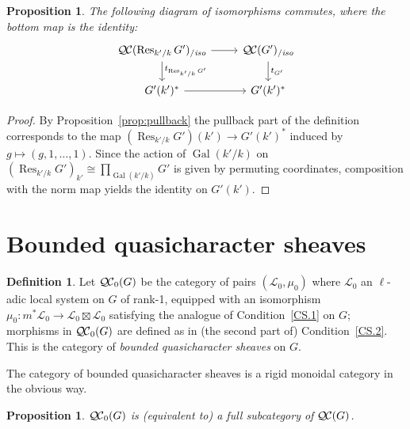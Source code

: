 \documentclass[11pt]{amsart}
\theoremstyle{plain}
\newtheorem{proposition}[theorem]{Proposition}
\theoremstyle{definition}
\newtheorem{definition}[theorem]{Definition}
\theoremstyle{remark}
\newcommand{\EE}{\mathbb{\bar Q}_\ell}
\DeclareMathOperator{\Gal}{Gal}
\DeclareMathOperator{\Res}{Res}
\newcommand{\sheafHom}{{\mathscr{H}\hskip-4pt{\it o}\hskip-2pt{\it m}}}
\newcommand{\ceq}{{\, :=\, }}
\newcommand{\qcs}[1]{{\mathcal{#1}}}
\newcommand{\QC}{{\mathcal{Q\hskip-0.8pt C}}}
\newcommand{\QCb}{{\QC_0}}
\newcommand{\QCiso}[1]{\QC(#1)_{/\textit{iso}}}
\newcommand{\trFrob}[1]{t_{#1}}
\begin{document}
\begin{proposition}
The following diagram of isomorphisms commutes, where the bottom map is the identity:
\[
\begin{tikzcd}
\QCiso{\Res_{k'/k} G'} \dar{\trFrob{\Res_{k'/k} G'}} \rar & \QCiso{G'} \dar{\trFrob{G'}}\\
G'(k')^* \rar & G'(k')^*
\end{tikzcd}
\]
\end{proposition}
\begin{proof}
By Proposition~\ref{prop:pullback} the pullback part of the definition corresponds to the map $(\Res_{k'/k}G')(k') \to G'(k')^*$
induced by $g \mapsto (g, 1, \ldots, 1)$.  Since the action of $\Gal(k'/k)$ on $(\Res_{k'/k}G')_{k'} \cong \prod_{\Gal(k'/k)} G'$
is given by permuting coordinates, composition with the norm map yields the identity on $G'(k')$.
\end{proof}

\section{Bounded quasicharacter sheaves}\label{sec:bounded}

\begin{definition}
Let $\QCb(G)$ be the category of pairs $(\qcs{L}_0,\mu_0)$ 
where $\qcs{L}_0$ an $\ell$-adic local system on $G$ of rank-1, 
equipped with an isomorphism $\mu_0 : m^* \qcs{L}_0 \to \qcs{L}_0 \boxtimes \qcs{L}_0$ 
satisfying the analogue of Condition~\ref{CS.1} on $G$; 
morphisms in $\QCb(G)$ are defined as in (the second part of) Condition~\ref{CS.2}. 
This is the category of \emph{bounded quasicharacter sheaves} on $G$. 
\end{definition}

The category of bounded quasicharacter sheaves is a rigid monoidal category in the obvious way. 

\begin{proposition}
$\QCb(G)$ is (equivalent to) a full subcategory of $\QC(G)$.
\end{proposition}
\end{document}
